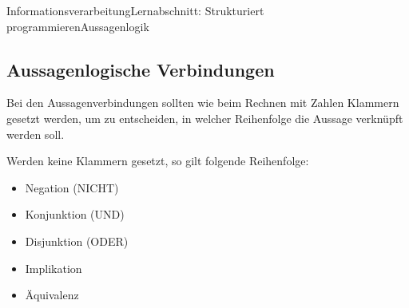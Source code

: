 \documentclass[11pt,oneside,openany,headings=optiontotoc,11pt,numbers=noenddot]{article}
\begin{document}
\begin{worksheet}{Informationsverarbeitung}{Lernabschnitt: Strukturiert programmieren}{Aussagenlogik}
		\subsection{Aussagenlogische Verbindungen}
		Bei den Aussagenverbindungen sollten wie beim Rechnen mit Zahlen Klammern gesetzt werden, um zu entscheiden, in welcher Reihenfolge die Aussage verknüpft werden soll.\\
		\par\noindent
		Werden keine Klammern gesetzt, so gilt folgende Reihenfolge:
		\begin{itemize}[label=-]
			\item Negation (NICHT)
			\item Konjunktion (UND)
			\item Disjunktion (ODER)
			\item Implikation
			\item Äquivalenz
		\end{itemize}
	\end{worksheet}
\end{document}
